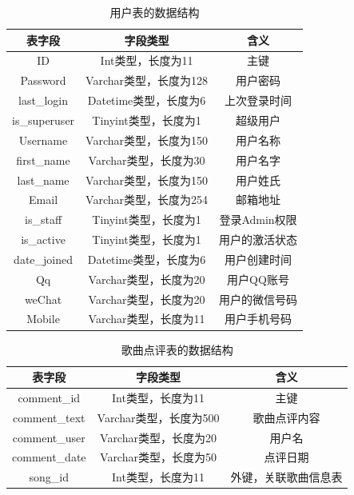 \documentclass[UTF8,14pt]{article}
\numberwithin{figure}{subsubsection}
\numberwithin{table}{subsubsection}
\begin{document}
\begin{table}[H]
	\centering
	\setlength{\abovecaptionskip}{0.cm}
	\setlength{\belowcaptionskip}{0.cm}
	\begin{tabular}{|c|c|c|}
		\hline
		表字段        & 字段类型               & 含义           \\ \hline
		ID            & Int类型，长度为11      & 主键           \\ \hline
		Password      & Varchar类型，长度为128 & 用户密码       \\ \hline
		last\_login   & Datetime类型，长度为6  & 上次登录时间   \\ \hline
		is\_superuser & Tinyint类型，长度为1   & 超级用户       \\ \hline
		Username      & Varchar类型，长度为150 & 用户名称       \\ \hline
		first\_name   & Varchar类型，长度为30  & 用户名字       \\ \hline
		last\_name    & Varchar类型，长度为150 & 用户姓氏       \\ \hline
		Email         & Varchar类型，长度为254 & 邮箱地址       \\ \hline
		is\_staff     & Tinyint类型，长度为1   & 登录Admin权限  \\ \hline
		is\_active    & Tinyint类型，长度为1   & 用户的激活状态 \\ \hline
		date\_joined  & Datetime类型，长度为6  & 用户创建时间   \\ \hline
		Qq            & Varchar类型，长度为20  & 用户QQ账号     \\ \hline
		weChat        & Varchar类型，长度为20  & 用户的微信号码 \\ \hline
		Mobile        & Varchar类型，长度为11  & 用户手机号码   \\ \hline
	\end{tabular}
	\caption{用户表的数据结构}
\end{table}
\vspace{-0.5cm}
\begin{table}[H]
	\centering
	\setlength{\abovecaptionskip}{0.cm}
	\setlength{\belowcaptionskip}{0.cm}
	\begin{tabular}{|c|c|c|}
		\hline
		表字段        & 字段类型               & 含义                 \\ \hline
		comment\_id   & Int类型，长度为11      & 主键                 \\ \hline
		comment\_text & Varchar类型，长度为500 & 歌曲点评内容         \\ \hline
		comment\_user & Varchar类型，长度为20  & 用户名               \\ \hline
		comment\_date & Varchar类型，长度为50  & 点评日期             \\ \hline
		song\_id      & Int类型，长度为11      & 外键，关联歌曲信息表 \\ \hline
	\end{tabular}
	\caption{歌曲点评表的数据结构}
\end{table}
\vspace*{-0.7cm}
\end{document}
